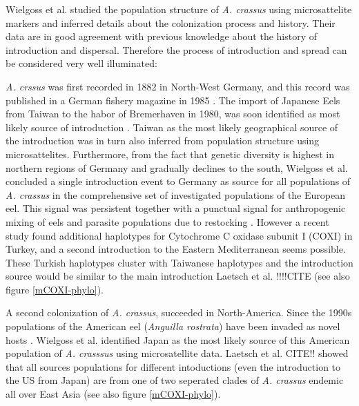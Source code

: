 Wielgoss et al. \cite{wielgoss_population_2008} studied the population
structure of \textit{A. crassus} using microsattelite markers and
inferred details about the colonization process and history. Their
data are in good agreement with previous knowledge about the history
of introduction and dispersal. Therefore the process of introduction
and spread can be considered very well illuminated:


\textit{A. crssus} was first recorded in 1882 in North-West Germany,
and this record was published in a German fishery magazine in 1985
\cite{fischer_teichwirt}. The import of Japanese Eels from Taiwan to
the habor of Bremerhaven in 1980, was soon identified as most likely
source of introduction
\cite{koops_anguillicola-infestations_1989}. Taiwan as the most likely
geographical source of the introduction was in turn also inferred from
population structure using microsattelites. Furthermore, from the fact
that genetic diversity is highest in northern regions of Germany and
gradually declines to the south, Wielgoss et al.  concluded a single
introduction event to Germany as source for all populations of
\textit{A. crassus} in the comprehensive set of investigated
populations of the European eel. This signal was persistent together
with a punctual signal for anthropogenic mixing of eels and parasite
populations due to restocking \cite{pmid20646147}. However a recent
study found additional haplotypes for Cytochrome C oxidase subunit I
(COXI) in Turkey, and a second introduction to the Eastern
Mediterranean seems possible. These Turkish haplotypes cluster with
Taiwanese haplotypes and the introduction source would be similar to
the main introduction Laetsch et al. !!!!CITE (see also figure
\ref{mCOXI-phylo}).

A second colonization of \textit{A. crassus}, succeeded in
North-America. Since the 1990s populations of the American eel
(\textit{Anguilla rostrata}) have been invaded as novel hosts
\cite{fries_notes:_1996,barse_exotic_1999,
  barse_swimbladder_2001}. Wielgoss et al. identified Japan as the
most likely source of this American population of \textit{A. crasssus}
using microsatellite data. Laetsch et al. CITE!! showed that all
sources populations for different intoductions (even the introduction
to the US from Japan) are from one of two seperated clades of
\textit{A. crassus} endemic all over East Asia (see also figure
\ref{mCOXI-phylo}).

